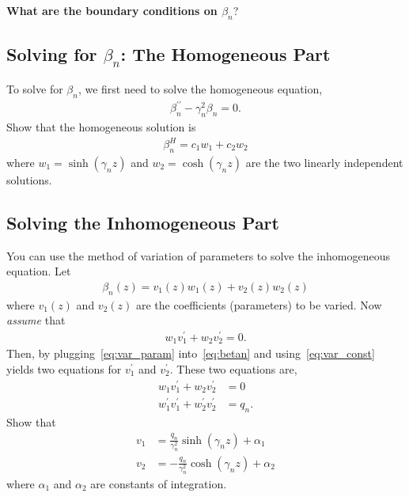 \documentclass[11pt]{article}
\begin{document}
    \textbf{What are the boundary conditions on $\beta_{n}$}?



    \subsection{Solving for $\beta_{n}$: The Homogeneous Part}
    To solve for $\beta_{n}$, we first need to solve the homogeneous equation,
    \begin{align}
      \beta_{n}^{\prime\prime} - \gamma_{n}^{2}\beta_{n} = 0.
    \end{align}
    Show that the homogeneous solution is 
    \begin{align}
      \beta_{n}^{H} = c_{1}w_{1} + c_{2}w_{2}
    \end{align}
    where $w_{1} = \sinh\left(\gamma_{n}z\right)$ and $w_{2} = \cosh\left(\gamma_{n}z\right)$ are the two linearly
independent solutions.



    \subsection{Solving the Inhomogeneous Part}
    You can use the method of variation of parameters to solve the inhomogeneous equation.  Let 
    \begin{align}
      \beta_{n}\left(z\right) = v_{1}\left(z\right)w_{1}\left(z\right) + v_{2}\left(z\right)w_{2}\left(z\right)
      \label{eq:var_param}
    \end{align}
    where $v_{1}\left(z\right)$ and $v_{2}\left(z\right)$ are the coefficients (parameters) to be varied.  Now
\textit{assume} that 
    \begin{align}
      w_{1}v_{1}^{\prime} + w_{2}v_{2}^{\prime} = 0. \label{eq:var_const}
    \end{align}
    Then, by plugging~\eqref{eq:var_param} into~\eqref{eq:betan} and using~\eqref{eq:var_const} yields two equations for
$v_{1}^{\prime}$ and $v_{2}^{\prime}$.  These two equations are, 
    \begin{align}
      w_{1}v_{1}^{\prime} + w_{2}v_{2}^{\prime} &= 0 \\
      w_{1}^{\prime}v_{1}^{\prime} + w_{2}^{\prime}v_{2}^{\prime} &= q_{n}.
    \end{align}
    Show that 
    \begin{align}
      v_{1} &= \frac{q_{n}}{\gamma_{n}^{2}}\sinh\left(\gamma_{n}z\right) + \alpha_{1} \\
      v_{2} &= -\frac{q_{n}}{\gamma_{n}^{2}}\cosh\left(\gamma_{n}z\right) + \alpha_{2} 
    \end{align}
    where $\alpha_{1}$ and $\alpha_{2}$ are constants of integration.
\end{document}
